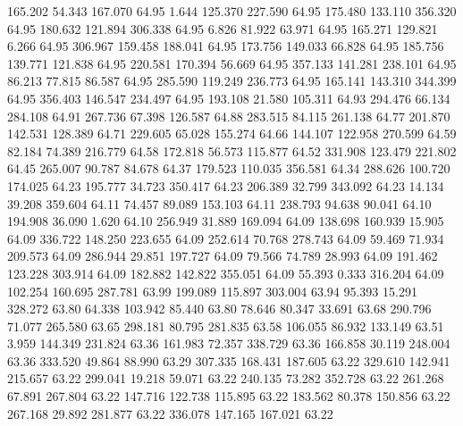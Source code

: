  165.202   54.343  167.070        64.95
   1.644  125.370  227.590        64.95
 175.480  133.110  356.320        64.95
 180.632  121.894  306.338        64.95
   6.826   81.922   63.971        64.95
 165.271  129.821    6.266        64.95
 306.967  159.458  188.041        64.95
 173.756  149.033   66.828        64.95
 185.756  139.771  121.838        64.95
 220.581  170.394   56.669        64.95
 357.133  141.281  238.101        64.95
  86.213   77.815   86.587        64.95
 285.590  119.249  236.773        64.95
 165.141  143.310  344.399        64.95
 356.403  146.547  234.497        64.95
 193.108   21.580  105.311        64.93
 294.476   66.134  284.108        64.91
 267.736   67.398  126.587        64.88
 283.515   84.115  261.138        64.77
 201.870  142.531  128.389        64.71
 229.605   65.028  155.274        64.66
 144.107  122.958  270.599        64.59
  82.184   74.389  216.779        64.58
 172.818   56.573  115.877        64.52
 331.908  123.479  221.802        64.45
 265.007   90.787   84.678        64.37
 179.523  110.035  356.581        64.34
 288.626  100.720  174.025        64.23
 195.777   34.723  350.417        64.23
 206.389   32.799  343.092        64.23
  14.134   39.208  359.604        64.11
  74.457   89.089  153.103        64.11
 238.793   94.638   90.041        64.10
 194.908   36.090    1.620        64.10
 256.949   31.889  169.094        64.09
 138.698  160.939   15.905        64.09
 336.722  148.250  223.655        64.09
 252.614   70.768  278.743        64.09
  59.469   71.934  209.573        64.09
 286.944   29.851  197.727        64.09
  79.566   74.789   28.993        64.09
 191.462  123.228  303.914        64.09
 182.882  142.822  355.051        64.09
  55.393    0.333  316.204        64.09
 102.254  160.695  287.781        63.99
 199.089  115.897  303.004        63.94
  95.393   15.291  328.272        63.80
  64.338  103.942   85.440        63.80
  78.646   80.347   33.691        63.68
 290.796   71.077  265.580        63.65
 298.181   80.795  281.835        63.58
 106.055   86.932  133.149        63.51
   3.959  144.349  231.824        63.36
 161.983   72.357  338.729        63.36
 166.858   30.119  248.004        63.36
 333.520   49.864   88.990        63.29
 307.335  168.431  187.605        63.22
 329.610  142.941  215.657        63.22
 299.041   19.218   59.071        63.22
 240.135   73.282  352.728        63.22
 261.268   67.891  267.804        63.22
 147.716  122.738  115.895        63.22
 183.562   80.378  150.856        63.22
 267.168   29.892  281.877        63.22
 336.078  147.165  167.021        63.22
